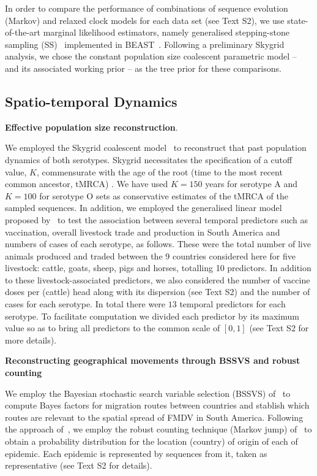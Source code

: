 \documentclass[10pt]{article}
\begin{document}
In order to compare the performance of combinations of sequence evolution (Markov) and relaxed clock models for each data set (see Text S2), we use state-of-the-art marginal likelihood estimators, namely generalised stepping-stone sampling (SS)~\citep{Baele2015} implemented in BEAST~\citep{Suchard2018}.
Following a preliminary Skygrid analysis, we chose the constant population size coalescent parametric model -- and its associated working prior -- as the tree prior for these comparisons.

\subsection*{Spatio-temporal Dynamics}

\textbf{Effective population size reconstruction}.

We employed the Skygrid coalescent model~\citep{Gill2012} to reconstruct that past population dynamics of both serotypes.
Skygrid necessitates the specification of a cutoff value, $K$, commensurate with the age of the root (time to the most recent common ancestor, tMRCA) .
We have used $K = 150$ years for serotype A and $K = 100$ for serotype O sets as conservative estimates of the tMRCA of the sampled sequences. 
In addition, we employed the generalised linear model proposed by~\cite{Gill2016} to test the association between several temporal predictors such as vaccination, overall livestock trade and production in South America and numbers of cases of each serotype, as follows.
These were the total number of live animals produced and traded between the 9 countries considered here for five livestock: cattle, goats, sheep, pigs and horses, totalling 10 predictors.
In addition to these livestock-associated predictors, we also considered the number of vaccine doses per (cattle) head along with its dispersion (see Text S2) and the number of cases for each serotype.
In total there were $13$ temporal predictors for each serotype.
To facilitate computation we divided each predictor by its maximum value so as to bring all predictors to the common scale of $[0, 1]$ (see Text S2 for more details).

\textbf{Reconstructing geographical movements through BSSVS and robust counting}

We employ the Bayesian stochastic search variable selection (BSSVS) of~\cite{Lemey2009} to compute Bayes factors for migration routes between countries and stablish which routes are relevant to the spatial spread of FMDV in South America.
Following the approach of~\cite{Hall2013}, we employ the robust counting technique (Markov jump) of~\cite{Minin2008b} to obtain a probability distribution for the location (country) of origin of each of epidemic.
Each epidemic is represented by sequences from it, taken as representative (see Text S2 for details).
\end{document}

